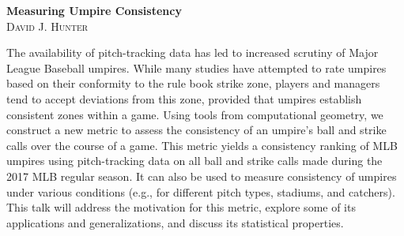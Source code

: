 \documentclass[12pt]{article}
\theoremstyle{definition}
\begin{document}
\begin{center}
 \textbf{Measuring Umpire Consistency} \\
 \textsc{David J. Hunter}
\end{center}

The availability of pitch-tracking data has led to increased scrutiny of Major League Baseball umpires. While many studies have attempted to rate umpires based on their conformity to the rule book strike zone, players and managers tend to accept deviations from this zone, provided that umpires establish consistent zones within a game. Using tools from computational geometry, we construct a new metric to assess the consistency of an umpire's ball and strike calls over the course of a game. This metric yields a consistency ranking of MLB umpires using pitch-tracking data on all ball and strike calls made during the 2017 MLB regular season. It can also be used to measure consistency of umpires under various conditions (e.g., for different pitch types, stadiums, and catchers). This talk will address the motivation for this metric, explore some of its applications and generalizations, and discuss its statistical properties.
\end{document}
